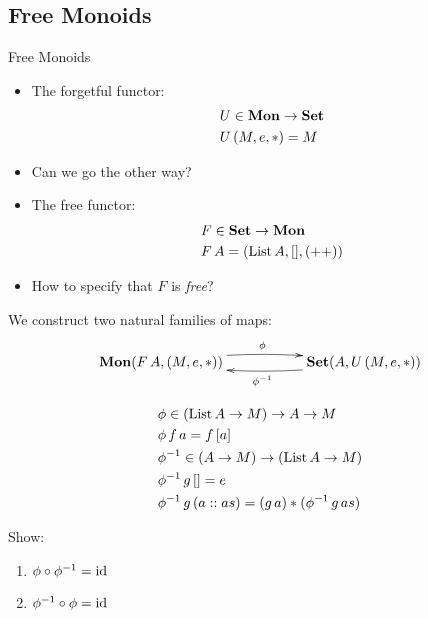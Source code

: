 \documentclass[handout]{beamer}
\begin{document}
\subsection{Free Monoids}

\begin{frame}{Free Monoids}

  \begin{itemize}
  \item The forgetful functor:
    \begin{align*}
      & U \in \mathbf{Mon} \to \mathbf{Set} \\
      & U\,(M,e,*) = M
    \end{align*}

  \item Can we go the other way?

  \item The free functor:
    \begin{align*}
      & F \in \mathbf{Set} \to \mathbf{Mon}\\
      & F\,A = (\mathrm{List}\,A,[],(++))
    \end{align*}

  \item How to specify that $F$ is \emph{free}?

  \end{itemize}
  
\end{frame}

\begin{frame}
  
  We construct two natural families of maps:
  \[\xymatrix{
    \hom{Mon}{F\,A}{(M,e,*)} \ar@/^/[rr]^\phi
      &&  \SETh{A}{U\,(M,e,*)} \ar@/^/[ll]^{\phi^{-1}}
  }\]

  \begin{align*}
    & \phi \in (\mathrm{List}\,A \to M) \to A \to M \\
    & \phi\,f\,a = f\,[a]\\
    & \phi^{-1}\in (A \to M) \to (\mathrm{List}\,A \to M)\\
    & \phi^{-1}\,g\,[] = e \\
    & \phi^{-1}\,g\,(a::as) = (g\,a) * (\phi^{-1}\,g\,as)
  \end{align*}

  \begin{exercise}
    Show:
    \begin{enumerate}
    \item $\phi \circ \phi^{-1} = \mathrm{id}$
      
    \item $\phi^{-1}\circ\phi = \mathrm{id}$
    \end{enumerate}
  \end{exercise}


\end{frame}
\end{document}
